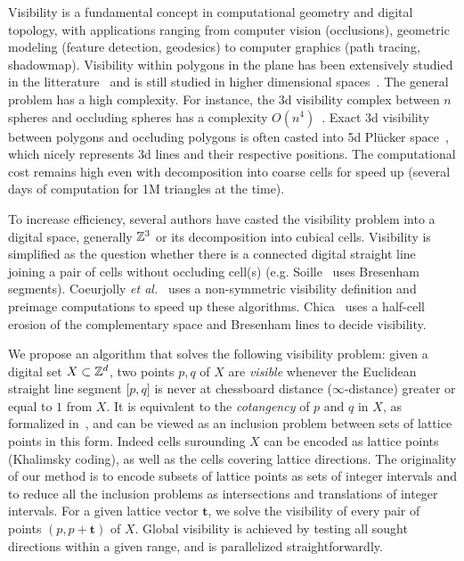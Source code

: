 \documentclass[runningheads]{llncs}
\begin{document}
    Visibility is a fundamental concept in computational geometry and
    digital topology, with applications ranging from computer vision
    (occlusions), geometric modeling (feature detection,
    geodesics) to computer graphics (path tracing,
    shadowmap). Visibility within polygons in the plane has been
    extensively studied in the litterature~\cite{ghosh:2007-book} and
    is still studied in higher dimensional
    spaces~\cite{orourke:2017-book}. The general problem has a high
    complexity. For instance, the 3d visibility complex between $n$
    spheres and occluding spheres has a complexity
    $O(n^4)$~\cite{durand:2002-tog}. Exact 3d visibility between
    polygons and occluding polygons is often casted into 5d Plücker
    space~\cite{nirenstein:2002-ewr}, which nicely represents 3d lines
    and their respective positions. The computational cost remains
    high even with decomposition into coarse cells for speed up
    (several days of computation for 1M triangles at the time).

    To increase efficiency, several authors have casted the
    visibility problem into a digital space, generally $\mathbb{Z}^3$ or its
    decomposition into cubical cells. Visibility is simplified as the
    question whether there is a connected digital straight line
    joining a pair of cells without occluding cell(s)
    (e.g. Soille~\cite{soille:1994-prl} uses Bresenham
    segments). Coeurjolly \emph{et al.}~\cite{coeurjolly:2004-prl}
    uses a non-symmetric visibility definition and preimage
    computations to speed up these
    algorithms. Chica~\cite{chica:2008-spm} uses a half-cell erosion
    of the complementary space and Bresenham lines to decide
    visibility.

    We propose an algorithm that solves the following visibility
    problem: given a digital set $X \subset \mathbb{Z}^d$, two points $p,q$ of
    $X$ are \emph{visible} whenever the Euclidean straight line
    segment $\lbrack p,q \rbrack$ is never at chessboard distance
    ($\infty$-distance) greater or equal to $1$ from $X$. It is
    equivalent to the \emph{cotangency} of $p$ and $q$ in $X$, as
    formalized in~\cite{lachaud:2021-dgmm,lachaud:2022-jmiv}, and can
    be viewed as an inclusion problem between sets of lattice points
    in this form. Indeed cells surounding $X$ can be encoded as
    lattice points (Khalimsky coding), as well as the cells covering
    lattice directions. The originality of our method is to encode
    subsets of lattice points as sets of integer intervals and to
    reduce all the inclusion problems as intersections and
    translations of integer intervals. For a given lattice vector
    $\mathbf{t}$, we solve the visibility of every pair of points
    $(p,p+\mathbf{t})$ of $X$. Global visibility is achieved by
    testing all sought directions within a given range, and is
    parallelized straightforwardly.
\end{document}
